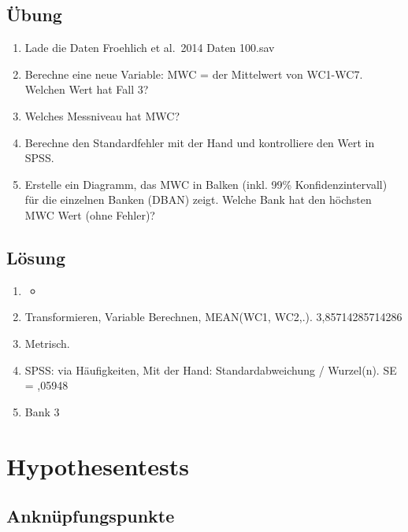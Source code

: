 \documentclass[
]{book}
\providecommand{\tightlist}{%
  \setlength{\itemsep}{0pt}\setlength{\parskip}{0pt}}
\begin{document}
\hypertarget{uxfcbung}{%
\section{Übung}\label{uxfcbung}}

\begin{enumerate}
\def\labelenumi{\arabic{enumi}.}
\tightlist
\item
  Lade die Daten Froehlich et al.~2014 Daten 100.sav
\item
  Berechne eine neue Variable: MWC = der Mittelwert von WC1-WC7. Welchen Wert hat Fall 3?
\item
  Welches Messniveau hat MWC?
\item
  Berechne den Standardfehler mit der Hand und kontrolliere den Wert in SPSS.
\item
  Erstelle ein Diagramm, das MWC in Balken (inkl. 99\% Konfidenzintervall) für die einzelnen Banken (DBAN) zeigt. Welche Bank hat den höchsten MWC Wert (ohne Fehler)?
\end{enumerate}

\hypertarget{luxf6sung-1}{%
\section{Lösung}\label{luxf6sung-1}}

\begin{enumerate}
\def\labelenumi{\arabic{enumi}.}
\item
  \begin{itemize}
  \item
  \end{itemize}
\item
  Transformieren, Variable Berechnen, MEAN(WC1, WC2,.). 3,85714285714286
\item
  Metrisch.
\item
  SPSS: via Häufigkeiten, Mit der Hand: Standardabweichung / Wurzel(n). SE = ,05948
\item
  Bank 3
\end{enumerate}

\hypertarget{hypothesentests}{%
\chapter{Hypothesentests}\label{hypothesentests}}

\hypertarget{anknuxfcpfungspunkte-3}{%
\section{Anknüpfungspunkte}\label{anknuxfcpfungspunkte-3}}
\end{document}
